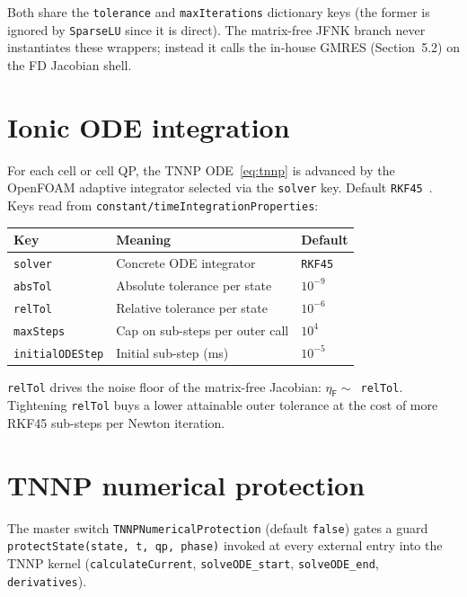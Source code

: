 \documentclass[11pt,a4paper]{article}
\newcommand{\code}[1]{\texttt{\small #1}}
\begin{document}
Both share the \code{tolerance} and \code{maxIterations} dictionary
keys (the former is ignored by \code{SparseLU} since it is direct).
The matrix-free JFNK branch never instantiates these wrappers; instead
it calls the in-house GMRES (Section~5.2) on the FD Jacobian shell.

\section{Ionic ODE integration}

For each cell or cell QP, the TNNP ODE~\eqref{eq:tnnp} is advanced by
the OpenFOAM adaptive integrator selected via the \code{solver} key.
Default \code{RKF45}~\cite{hairer2}. Keys read from
\code{constant/timeIntegrationProperties}:

\begin{center}
\begin{tabular}{@{}lll@{}}
\toprule
Key & Meaning & Default \\
\midrule
\code{solver} & Concrete ODE integrator & \code{RKF45} \\
\code{absTol} & Absolute tolerance per state & $10^{-9}$ \\
\code{relTol} & Relative tolerance per state & $10^{-6}$ \\
\code{maxSteps} & Cap on sub-steps per outer call & $10^{4}$ \\
\code{initialODEStep} & Initial sub-step (ms) & $10^{-5}$ \\
\bottomrule
\end{tabular}
\end{center}

\code{relTol} drives the noise floor of the matrix-free Jacobian:
$\eta_{\mathsf{F}} \sim $~\code{relTol}. Tightening \code{relTol} buys
a lower attainable outer tolerance at the cost of more RKF45 sub-steps
per Newton iteration.

\section{TNNP numerical protection}

The master switch \code{TNNPNumericalProtection} (default \code{false})
gates a guard \code{protectState(state, t, qp, phase)} invoked at every
external entry into the TNNP kernel (\code{calculateCurrent},
\code{solveODE\_start}, \code{solveODE\_end}, \code{derivatives}).
\end{document}
